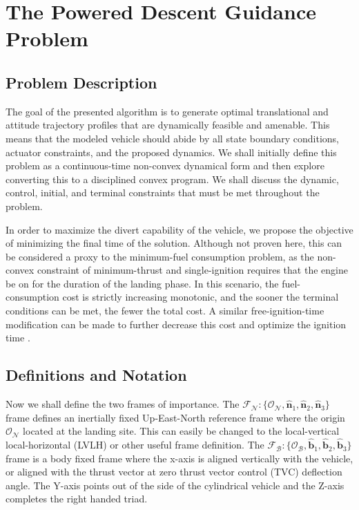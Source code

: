 \chapter{The Powered Descent Guidance Problem}
\label{mathchapter}

\section{Problem Description}
The goal of the presented algorithm is to generate optimal translational and attitude trajectory profiles that are dynamically feasible and amenable. This means that the modeled vehicle should abide by all state boundary conditions, actuator constraints, and the proposed dynamics. We shall initially define this problem as a continuous-time non-convex dynamical form and then explore converting this to a disciplined convex program. We shall discuss the dynamic, control, initial, and terminal constraints that must be met throughout the problem.

In order to maximize the divert capability of the vehicle, we propose the objective of minimizing the final time of the solution. Although not proven here, this can be considered a proxy to the minimum-fuel consumption problem, as the non-convex constraint of minimum-thrust and single-ignition requires that the engine be on for the duration of the landing phase. In this scenario, the fuel-consumption cost is strictly increasing monotonic, and the sooner the terminal conditions can be met, the fewer the total cost. A similar free-ignition-time modification can be made to further decrease this cost and  optimize the ignition time \cite{szmuk2019successive}. 

\section{Definitions and Notation}

Now we shall define the two frames of importance. The $\mathcal{F}_\mathcal{N} : \{\mathcal{O}_\mathcal{N}, \hat{\bm{n}}_1, \hat{\bm{n}}_2, \hat{\bm{n}}_3 \}$ frame defines an inertially fixed Up-East-North reference frame where the origin $\mathcal{O}_\mathcal{N}$ located at the landing site. This can easily be changed to the local-vertical local-horizontal (LVLH) or other useful frame definition. The $\mathcal{F}_\mathcal{B}: \{\mathcal{O}_\mathcal{B}, \hat{\bm{b}}_1, \hat{\bm{b}}_2, \hat{\bm{b}}_3 \}$ frame is a body fixed frame where the x-axis is aligned vertically with the vehicle, or aligned with the thrust vector at zero thrust vector control (TVC) deflection angle. The Y-axis points out of the side of the cylindrical vehicle and the Z-axis completes the right handed triad.

